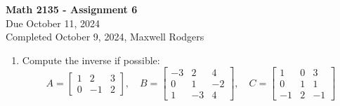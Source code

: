 \documentclass[12pt,a4paper]{amsart}
\begin{document}
\begin{center}
{\Large\textbf{Math 2135 - Assignment 6}}\\
\medskip
Due October 11, 2024 \\
\smallskip
Completed October 9, 2024, Maxwell Rodgers
\end{center}
\medskip
\thispagestyle{empty}



\medskip

\begin{enumerate}
\item
 Compute the inverse if possible: 
\[
 A = \left[\begin{matrix} 1 & 2 & 3 \\ 0 & -1 & 2 \end{matrix}\right], \quad
 B = \left[\begin{matrix} -3 & 2 &  4 \\ 0 & 1 & -2 \\ 1 & -3 & 4 \end{matrix}\right], \quad
 C = \left[\begin{matrix} 1 & 0 & 3 \\ 0 & 1 & 1 \\ -1 & 2 & -1 \end{matrix}\right]
\]



\end{enumerate}
\end{document}
